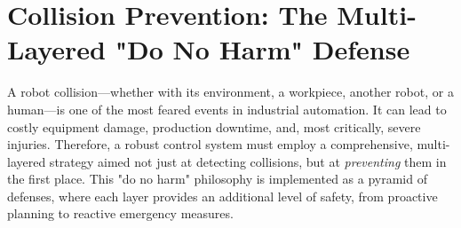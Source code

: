















\section{Collision Prevention: The Multi-Layered "Do No Harm" Defense}
\label{sec:collision_prevention}

A robot collision—whether with its environment, a workpiece, another robot, or a human—is one of the most feared events in industrial automation. It can lead to costly equipment damage, production downtime, and, most critically, severe injuries. Therefore, a robust control system must employ a comprehensive, multi-layered strategy aimed not just at detecting collisions, but at \textit{preventing} them in the first place. This "do no harm" philosophy is implemented as a pyramid of defenses, where each layer provides an additional level of safety, from proactive planning to reactive emergency measures.

